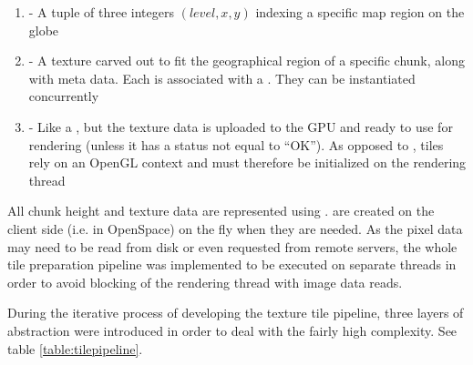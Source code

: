 \begin{enumerate}
	\item \textbf{} - A tuple of three integers $(level, x, y)$ indexing a specific map region on the globe
	\item \textbf{} - A texture carved out to fit the geographical region of a specific chunk, along with meta data. Each  is associated with a . They can be instantiated concurrently
	\item \textbf{} - Like a , but the texture data is uploaded to the GPU and ready to use for rendering (unless it has a status not equal to ``OK''). As opposed to , tiles rely on an OpenGL context and must therefore be initialized on the rendering thread
\end{enumerate}

All chunk height and texture data are represented using .  are created on the client side (i.e. in OpenSpace) on the fly when they are needed. As the pixel data may need to be read from disk or even requested from remote servers, the whole tile preparation pipeline was implemented to be executed on separate threads in order to avoid blocking of the rendering thread with image data reads. 

During the iterative process of developing the texture tile pipeline, three layers of abstraction were introduced in order to deal with the fairly high complexity. See table \ref{table:tilepipeline}.

\begin{center}
  \begin{table}
  \caption[]{Abstraction layers used in the texture data pipeline}
    \label{table:tilepipeline}
  \end{table}
\end{center}

